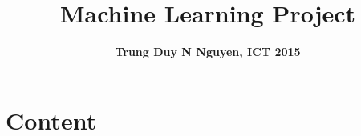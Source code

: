 \documentclass{article}
\title{\textbf{Machine Learning Project}}
\author{\textbf{Trung Duy N Nguyen, ICT 2015}}
\begin{document}
    
    
    \maketitle
    
    

    




\section*{Content}\label{content}
\end{document}
